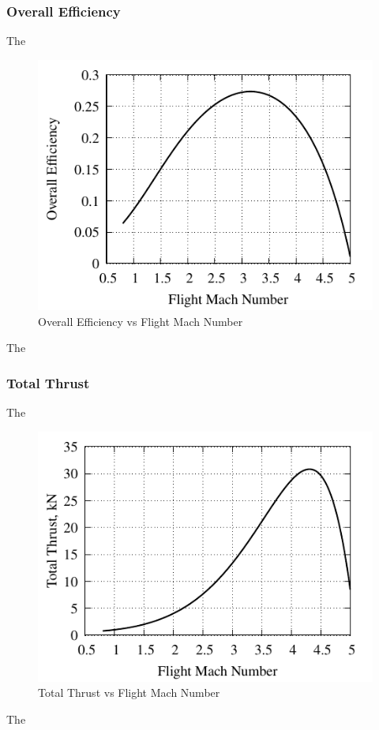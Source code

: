 \documentclass[conf]{new-aiaa} %
\begin{document}
\subsubsection{Overall Efficiency}
The

\begin{figure}[hbt!]
\centering
\includegraphics[]{media/performance_parameter_files/part_c_eta_o.pdf}
\caption{\label{fig:partcetao} Overall Efficiency vs Flight Mach Number}
\end{figure}
The

\subsubsection{Total Thrust}
The

\begin{figure}[hbt!]
\centering
\includegraphics[]{media/performance_parameter_files/part_c_T.pdf}
\caption{\label{fig:partct} Total Thrust vs Flight Mach Number}
\end{figure}
The
\end{document}

